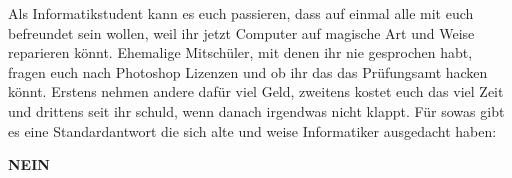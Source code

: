 Als Informatikstudent kann es euch passieren, dass auf einmal alle mit euch
befreundet sein wollen, weil ihr jetzt Computer auf magische Art und Weise
reparieren k\"onnt. Ehemalige Mitsch\"uler, mit denen ihr nie gesprochen habt,
fragen euch nach Photoshop Lizenzen und ob ihr das das Pr\"ufungsamt hacken
k\"onnt. Erstens nehmen andere daf\"ur viel Geld, zweitens kostet euch das viel
Zeit und drittens seit ihr schuld, wenn danach irgendwas nicht klappt. F\"ur
sowas gibt es eine Standardantwort die sich alte und weise Informatiker
ausgedacht haben:
\begin{center}\textbf{\Huge NEIN}\end{center}


